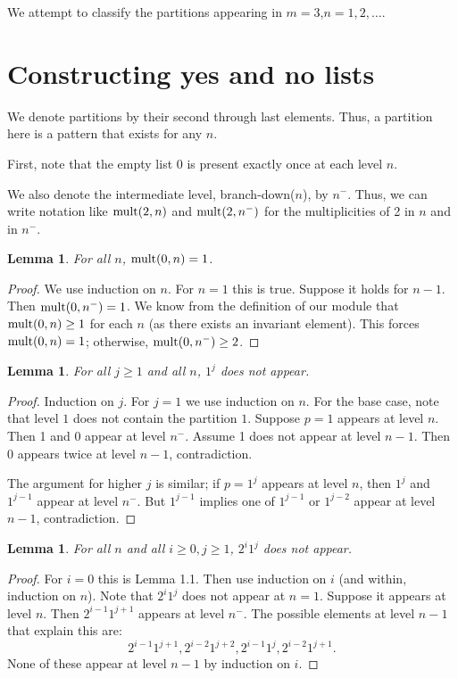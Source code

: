 \documentclass{article}
\theoremstyle{plain}
\newtheorem{lemma}[theorem]{Lemma}
\theoremstyle{definition}
\newcommand{\mult}{\textup{mult}}
\begin{document}
We attempt to classify the partitions appearing in $m=3$,$n = 1, 2, \ldots$.
\section{Constructing yes and no lists}
We denote partitions by their second through last elements.
Thus, a partition here is a pattern that exists for any $n$.

First, note that the empty list 0 is present exactly once at each level $n$.

We also denote the intermediate level, branch-down($n$), by $n^-$. 
Thus, we can write notation like $\mult(2,n)$ and $\mult(2,n^-)$ for the multiplicities of 2 in $n$ and in $n^-$.

\begin{lemma}
For all $n$, $\mult(0,n)=1$.
\end{lemma}
\begin{proof}
We use induction on $n$. For $n=1$ this is true. Suppose it holds for $n-1$.
Then $\mult(0,n^-)=1$.
We know from the definition of our module that $\mult(0,n) \ge 1$ for each $n$ (as there exists an invariant element).
This forces $\mult(0,n)=1$; otherwise, $\mult(0,n^-) \ge 2$.
\end{proof}

\begin{lemma}
For all $j \ge 1$ and all $n$, $1^j$ does not appear.
\end{lemma}
\begin{proof}
Induction on $j$. 
For $j = 1$ we use induction on $n$.
For the base case, note that level $1$ does not contain the partition $1$.
Suppose $p = 1$ appears at level $n$.
Then 1 and 0 appear at level $n^-$.
Assume 1 does not appear at level $n-1$. Then 0 appears twice at level $n-1$, contradiction.

The argument for higher $j$ is similar; if $p=1^j$ appears at level $n$, then $1^j$ and $1^{j-1}$ appear at level $n^-$. 
But $1^{j-1}$ implies one of $1^{j-1}$ or $1^{j-2}$ appear at level $n-1$, contradiction.

\end{proof}

\begin{lemma}
For all $n$ and all $i\ge 0, j \ge 1$, $2^i1^j$ does not appear.
\end{lemma}
\begin{proof}
For $i=0$ this is Lemma 1.1.
Then use induction on $i$ (and within, induction on $n$).
Note that $2^i1^j$ does not appear at $n=1$.
Suppose it appears at level $n$.
Then $2^{i-1}1^{j+1}$ appears at level $n^-$.
The possible elements at level $n-1$ that explain this are:
$$
2^{i-1}1^{j+1},
2^{i-2}1^{j+2},
2^{i-1}1^{j},
2^{i-2}1^{j+1}.
$$
None of these appear at level $n-1$ by induction on $i$.
\end{proof}
\end{document}
